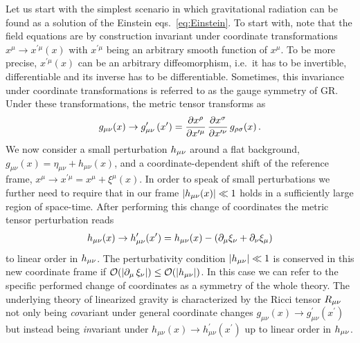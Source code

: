 Let us start with the simplest scenario in which gravitational radiation can be found as a solution of the Einstein eqs.~\eqref{eq:Einstein}. To start with, note that the field equations are by construction invariant under coordinate transformations $x^\mu \rightarrow x^{\prime\mu}(x)$ with $x^{\prime\mu}$ being an arbitrary smooth function of $x^\mu$. To be more precise, $x^{\prime \mu}(x)$ can  be an arbitrary diffeomorphism, i.e.~it has to be invertible, differentiable and its inverse has to be differentiable. Sometimes, this invariance under coordinate transformations is referred to as the gauge symmetry of \ac{GR}. Under these transformations, the metric tensor transforms as
\begin{align}
	g_{\mu \nu}(x) \rightarrow g^\prime_{\mu \nu}\left( x^\prime \right) = \frac{\partial x^\rho}{\partial x^{\prime \mu}}\, \frac{\partial x^\sigma}{\partial x^{\prime \nu}} \,g_{\rho \sigma}(x) \, .
	\label{eq:metrictrafo}
\end{align}
We now consider a small perturbation $h_{{\mu \nu}}$ around a flat background, $g_{\mu \nu}(x) = \eta_{\mu \nu} + h_{\mu \nu}(x)$, and a coordinate-dependent shift of the reference frame, $x^\mu \rightarrow x^{\prime \mu} = x^\mu + \xi^\mu(x)$. In order to speak of small perturbations we further need to require that in our frame $\lvert h_{\mu \nu}(x)\rvert \ll 1$ holds in a sufficiently large region of space-time. After performing this change of coordinates the metric tensor perturbation reads
\begin{align}
	h_{\mu \nu}(x) \rightarrow h^\prime_{\mu \nu}(x^\prime) = h_{\mu \nu}(x) - \left( \partial_\mu \xi_\nu + \partial_\nu \xi_\mu \right) \label{eq:linmetrictrafo}
\end{align}
to linear order in $h_{{\mu \nu}}$. The perturbativity condition $\lvert h_{\mu \nu}\rvert \ll 1$ is conserved in this new coordinate frame if  $\mathcal{O}(\lvert\partial_\mu  \, \xi_\nu\rvert) \le \mathcal{O}(\lvert h_{\mu \nu}\rvert)$. In this case we can refer to the specific performed change of coordinates as a symmetry of the whole theory. The underlying theory of linearized gravity is characterized by the Ricci tensor $R_{{\mu \nu}}$ not only  being \textit{co}variant under general coordinate changes $g_{\mu \nu}(x) \rightarrow g^\prime_{\mu \nu}(x^\prime)$ but instead being \textit{in}variant under $h_{\mu \nu}(x) \rightarrow h^\prime_{\mu \nu}(x^\prime)$ up to linear order in $h_{{\mu \nu}}$.

